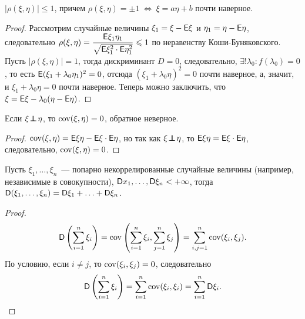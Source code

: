 \begin{property}
	$| \rho (\xi , \eta ) | \leqslant 1$, причем $\rho ( \xi , \eta ) = \pm 1 ~\Leftrightarrow~ \xi = a \eta + b$ почти наверное.
	\begin{proof}
		Рассмотрим случайные величины $\xi_1 = \xi - \mathsf{E} \xi$ и $\eta_1 = \eta - \mathsf{E} \eta$, следовательно $\rho ( \xi , \eta ) = \dfrac{\mathsf{E} \xi_1 \eta_1}{\sqrt{\mathsf{E} \xi_1^2 \cdot \mathsf{E} \eta_1^2}} \leqslant 1$ по неравенству Коши-Буняковского. Пусть $| \rho (\xi, \eta)| = 1$, тогда дискриминант $D = 0$, следовательно, $\exists !\lambda_0: f(\lambda_0) = 0$,  то есть $\mathsf{E} ( \xi_1 + \lambda_0 \eta_1 )^2 = 0$, отсюда $(\xi_1 + \lambda_0 \eta )^2 = 0$ почти наверное, а, значит, и $\xi_1 + \lambda_0 \eta  = 0$ почти наверное. Теперь можно заключить, что $\xi = \mathsf{E} \xi - \lambda_0 (\eta - \mathsf{E} \eta )$.
	\end{proof}
\end{property}
\begin{property} 
	Если $\xi \!\perp\!\!\!\!\perp\! \eta$, то $\operatorname{cov} (\xi, \eta) = 0$, обратное неверное.
	\begin{proof}
			$\operatorname{cov}( \xi, \eta) = \mathsf{E} \xi \eta - \mathsf{E} \xi \cdot \mathsf{E} \eta$, но так как $\xi \!\perp\!\!\!\!\perp\! \eta$, то $\mathsf{E} \xi \eta = \mathsf{E} \xi \cdot \mathsf{E} \eta$, следовательно, $\operatorname{cov}( \xi, \eta ) = 0$.
	\end{proof}
\end{property}
\begin{lemma}
	Пусть $\xi_1, \ldots, \xi_n$~--- попарно некоррелированные случайные величины (например, независимые в совокупности), $\mathsf{D} x_1, \ldots, \mathsf{D} \xi_n < +\infty$, тогда $\mathsf{D} ( \xi_1, \ldots, \xi_n ) = \mathsf{D} \xi_1 + \ldots + \mathsf{D} \xi_n$.
	\begin{proof}
		$$\mathsf{D} \left( \sum_{i=1}^n \xi_i \right) = \operatorname{cov} \left( \sum_{i=1}^n \xi_i, \sum_{j=1}^n \xi_j \right) = \sum_{i, j = 1}^n \operatorname{cov} (\xi_i, \xi_j).$$
		По условию, если $i \neq j$, то $\operatorname{cov} (\xi_i, \xi_j) = 0$, следовательно 
		$$\mathsf{D} \left( \sum_{i=1}^n \xi_i \right) = \sum_{i=1}^n \operatorname{cov} (\xi_i, \xi_i) = \sum_{i=1}^n \mathsf{D} \xi_i.$$
	\end{proof}
\end{lemma}
